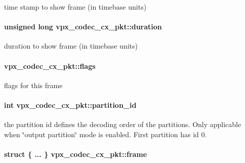 time stamp to show frame (in timebase units) \hypertarget{structvpx__codec__cx__pkt_afb8d9069980e759d97d2eb9fae7e5e06}{
\paragraph[{duration}]{\setlength{\rightskip}{0pt plus 5cm}unsigned long {\bf vpx\-\_\-codec\-\_\-cx\-\_\-pkt\-::duration}}}
\label{structvpx__codec__cx__pkt_afb8d9069980e759d97d2eb9fae7e5e06}
duration to show frame (in timebase units) \hypertarget{structvpx__codec__cx__pkt_a3876fe0306342611465e9c15c6c4ae2f}{
\paragraph[{flags}]{ {\bf vpx\-\_\-codec\-\_\-cx\-\_\-pkt\-::flags}}}
\label{structvpx__codec__cx__pkt_a3876fe0306342611465e9c15c6c4ae2f}
flags for this frame \hypertarget{structvpx__codec__cx__pkt_aaffee6af93af238ca7a145fb56c6d6f7}{
\paragraph[{partition\-\_\-id}]{\setlength{\rightskip}{0pt plus 5cm}int {\bf vpx\-\_\-codec\-\_\-cx\-\_\-pkt\-::partition\-\_\-id}}}
\label{structvpx__codec__cx__pkt_aaffee6af93af238ca7a145fb56c6d6f7}
the partition id defines the decoding order of the partitions. \-Only applicable when \char`\"{}output partition\char`\"{} mode is enabled. \-First partition has id 0. \hypertarget{structvpx__codec__cx__pkt_a81e33bf4408a3983abb16492fee359ff}{
\paragraph[{frame}]{\setlength{\rightskip}{0pt plus 5cm}struct \{ ... \}   {\bf vpx\-\_\-codec\-\_\-cx\-\_\-pkt\-::frame}}}
